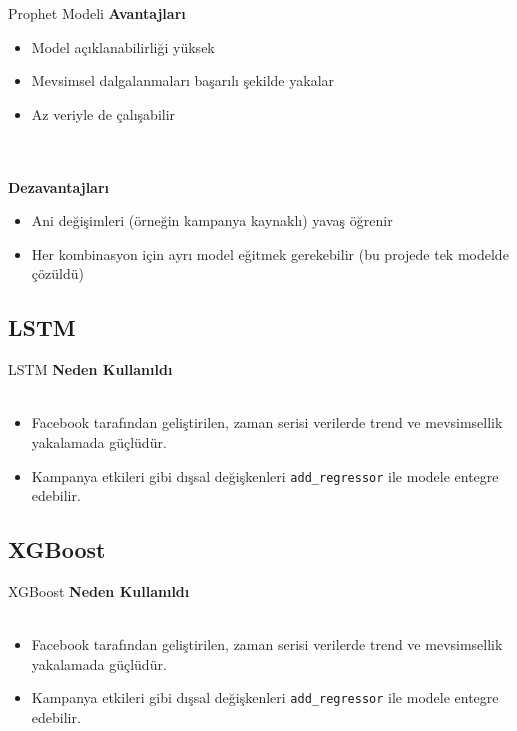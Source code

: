 \documentclass[12pt]{beamer}
\begin{document}
\begin{frame}{Prophet Modeli}
	\textbf{Avantajları} 
	\begin{itemize}
		\item Model açıklanabilirliği yüksek
		\item Mevsimsel dalgalanmaları başarılı şekilde yakalar
		\item Az veriyle de çalışabilir
	\end{itemize}
	\\~\\
	\textbf{Dezavantajları} 
	\begin{itemize}
		\item Ani değişimleri (örneğin kampanya kaynaklı) yavaş öğrenir
		\item Her kombinasyon için ayrı model eğitmek gerekebilir (bu projede tek modelde çözüldü)
	\end{itemize}
\end{frame}


\subsection{LSTM}
\begin{frame}{LSTM}
	\textbf{Neden Kullanıldı} \\~\\
	\begin{itemize}
		\item Facebook tarafından geliştirilen, zaman serisi verilerde trend ve mevsimsellik yakalamada güçlüdür.
		\item Kampanya etkileri gibi dışsal değişkenleri \texttt{add\_regressor} ile modele entegre edebilir.
	\end{itemize}
\end{frame}


\subsection{XGBoost}
\begin{frame}{XGBoost}
	\textbf{Neden Kullanıldı} \\~\\
	\begin{itemize}
		\item Facebook tarafından geliştirilen, zaman serisi verilerde trend ve mevsimsellik yakalamada güçlüdür.
		\item Kampanya etkileri gibi dışsal değişkenleri \texttt{add\_regressor} ile modele entegre edebilir.
	\end{itemize}
\end{frame}
\end{document}
